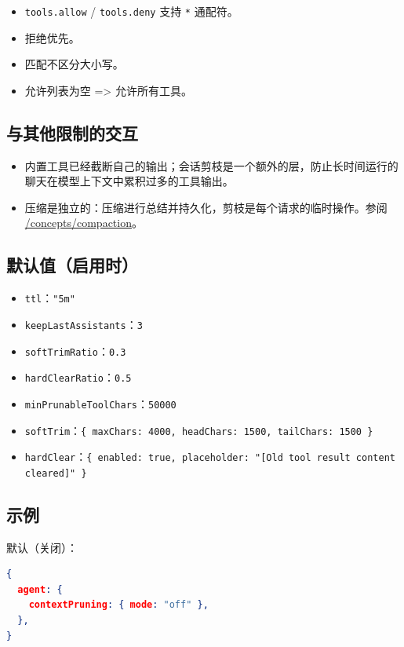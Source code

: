 \begin{itemize}
  \item \texttt{tools.allow} / \texttt{tools.deny} 支持 \texttt{*} 通配符。
  \item 拒绝优先。
  \item 匹配不区分大小写。
  \item 允许列表为空 => 允许所有工具。
\end{itemize}


\subsection{与其他限制的交互}


\begin{itemize}
  \item 内置工具已经截断自己的输出；会话剪枝是一个额外的层，防止长时间运行的聊天在模型上下文中累积过多的工具输出。
  \item 压缩是独立的：压缩进行总结并持久化，剪枝是每个请求的临时操作。参阅 \href{/concepts/compaction}{/concepts/compaction}。
\end{itemize}


\subsection{默认值（启用时）}


\begin{itemize}
  \item \texttt{ttl}：\texttt{"5m"}
  \item \texttt{keepLastAssistants}：\texttt{3}
  \item \texttt{softTrimRatio}：\texttt{0.3}
  \item \texttt{hardClearRatio}：\texttt{0.5}
  \item \texttt{minPrunableToolChars}：\texttt{50000}
  \item \texttt{softTrim}：\texttt{\{ maxChars: 4000, headChars: 1500, tailChars: 1500 \}}
  \item \texttt{hardClear}：\texttt{\{ enabled: true, placeholder: "[Old tool result content cleared]" \}}
\end{itemize}


\subsection{示例}


默认（关闭）：

\begin{lstlisting}[language=json]
{
  agent: {
    contextPruning: { mode: "off" },
  },
}
\end{lstlisting}



